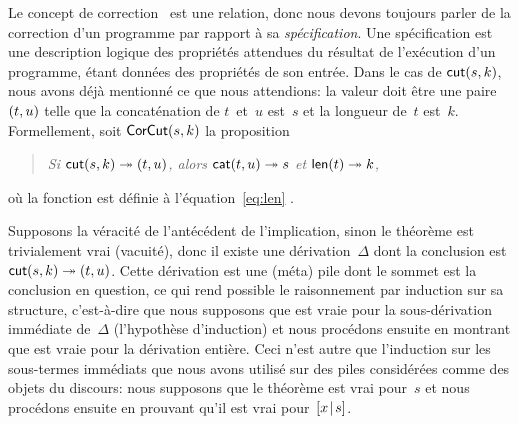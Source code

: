 \label{par:cut_sound}

Le concept de correction~\citep{McCarthy_1962, Floyd_1967, Hoare_1971,
  Dijkstra_1976} est une relation, donc nous devons toujours parler de
la correction d'un programme par rapport à sa
\emph{spécification}. Une spécification est une
description logique des propriétés attendues du résultat de
l'exécution d'un programme, étant données des propriétés de son
entrée. Dans le cas de \(\textsf{cut}(s,k)\), nous avons déjà mentionné
ce que nous attendions: la valeur doit être une paire \(({t},{u})\)
telle que la concaténation de \(t\)~et~\(u\) est~\(s\) et la longueur
de~\(t\) est~\(k\). Formellement, soit
\(\textsf{CorCut}({s,k})\) la
proposition
\begin{quote}
  \textsl{Si \(\textsf{cut}(s,k) \twoheadrightarrow ({t},{u})\), alors
    \(\textsf{cat}(t,u) \twoheadrightarrow s\) et \(\textsf{len}(t)
    \twoheadrightarrow k\),}
\end{quote}
où la fonction  est définie à
l'équation~\eqref{eq:len} .

Supposons la véracité de l'antécédent de l'implication, sinon le
théorème est trivialement vrai (vacuité), donc il existe une
dérivation~\(\Delta\) dont la conclusion est \(\textsf{cut}(s,k)
\twoheadrightarrow ({t},{u})\). Cette dérivation est une (méta) pile
dont le sommet est la conclusion en question, ce qui rend possible le
raisonnement par induction sur sa structure, c'est-à-dire que nous
supposons que  est vraie pour la sous-dérivation
immédiate de~\(\Delta\) (l'hypothèse d'induction) et nous procédons
ensuite en montrant que  est vraie pour la dérivation
entière. Ceci n'est autre que l'induction sur les sous-termes
immédiats que nous avons utilisé sur des piles considérées comme des
objets du discours: nous supposons que le théorème est vrai pour~\(s\)
et nous procédons ensuite en prouvant qu'il est vrai
pour~\([{x}\!\mid\!{s}]\).

